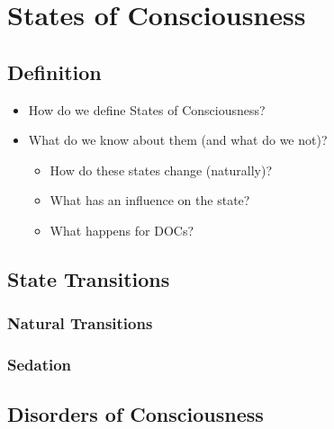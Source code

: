 
\section{States of Consciousness}\label{sec:states-of-consciousness}

\subsection{Definition}\label{subsec:definition}
\qquad {}
 \begin{itemize}
	\item How do we define States of Consciousness?
	\item What do we know about them (and what do we not)?
	\begin{itemize}
		\item How do these states change (naturally)?
		\item What has an influence on the state?
		\item What happens for DOCs?
	\end{itemize}
 \end{itemize}

\cite{porcaro_diagnostic_2022}
\subsection{State Transitions}\label{subsec:state-transitions}

\subsubsection{Natural Transitions}
    \qquad \qquad {}
\subsubsection{Sedation}
    \qquad \qquad {}
\subsection{Disorders of Consciousness}\label{subsec:disorders-of-consciousness}
\qquad {}


